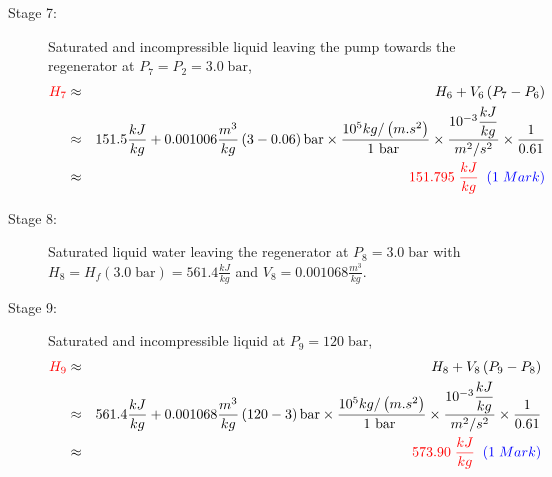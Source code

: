 \documentclass[12pt,twoside]{report}
\newcommand{\frc}{\displaystyle\frac}
\begin{document}
\begin{description}
\begin{enumerate}[(a)]
\begin{description}
\item [Stage 7:] Saturated and incompressible liquid leaving the pump towards the regenerator at $P_{7}=P_{2}=3.0\;\text{bar}$,
\begin{eqnarray}
\textcolor{red}{H_{7}}&\approx& H_{6} + V_{6}\left(P_{7}-P_{6}\right) \nonumber \\
                     &\approx& 151.5 \frc{kJ}{kg} + 0.001006 \frc{m^{3}}{kg}\left(3-0.06\right)\text{bar} \times \frc{10^{5} kg/\left(m.s^{2}\right)}{1\text{ bar }} \times \frc{10^{-3} \frc{kJ}{kg}}{m^{2}/s^{2}}\times \frc{1}{0.61} \nonumber \\
     &\approx& \textcolor{red}{151.795\;\frc{kJ}{kg}}\;\;\textcolor{blue}{(1\; Mark)} \nonumber
\end{eqnarray}

\item [Stage 8:] Saturated liquid water leaving the regenerator at $P_{8}=3.0\;\text{bar}$ with $H_{8}=H_{f}\left(3.0\;\text{bar}\right)=561.4\frc{kJ}{kg}$ and $V_{8}=0.001068\frc{m^{3}}{kg}$.

\item[Stage 9:] Saturated and incompressible liquid at $P_{9}=120\;\text{bar}$,
\begin{eqnarray}
\textcolor{red}{H_{9}}&\approx& H_{8} + V_{8}\left(P_{9}-P_{8}\right) \nonumber \\
                     &\approx& 561.4 \frc{kJ}{kg} + 0.001068 \frc{m^{3}}{kg}\left(120-3\right)\text{bar} \times \frc{10^{5} kg/\left(m.s^{2}\right)}{1\text{ bar }} \times \frc{10^{-3} \frc{kJ}{kg}}{m^{2}/s^{2}}\times \frc{1}{0.61} \nonumber \\
     &\approx& \textcolor{red}{573.90\;\frc{kJ}{kg}}\;\;\textcolor{blue}{(1\; Mark)} \nonumber
\end{eqnarray}
%
\end{description}


\end{enumerate}
\end{description}
\end{document}

